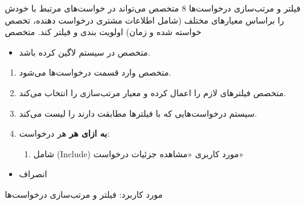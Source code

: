 {
\usecase
{فیلتر و مرتب‌سازی درخواست‌ها}
{8}
{متخصص می‌تواند در خواست‌های مرتبط با خودش را براساس معیارهای مختلف (شامل اطلاعات مشتری درخواست دهنده، تخصص‌ خواسته شده و زمان) اولویت بندی و فیلتر کند.}
{متخصص}
{}
{	
	\begin{itemize}
		\vspace*{-0.6cm}
		\item 
		متخصص در سیستم لاگین کرده باشد.
	\end{itemize}
}
{
	\vspace*{-0.6cm}
	\begin{enumerate}
		\item 
		متخصص وارد قسمت درخواست‌ها می‌شود.
		\item
		متخصص فیلترهای لازم را اعمال کرده و معیار مرتب‌سازی را انتخاب می‌کند.
		\item
		سیستم درخواست‌هایی که با فیلترها مطابقت دارند را لیست می‌کند.
		
		\item
		\textbf{به ازای هر} هر درخواست:
		
		\begin{enumerate}[label=\theenumi.\arabic*.]
			\item
			شامل (Include) مورد کاربری «مشاهده جزئیات درخواست»
		\end{enumerate}
	
	\end{enumerate}
}
{}
{
	\begin{itemize}
		\item
		انصراف
\end{itemize}
}
{
	مورد کاربرد: فیلتر و مرتب‌سازی درخواست‌ها
}

}



